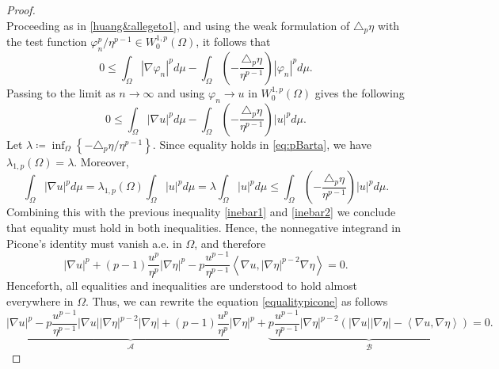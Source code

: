 \documentclass{article}
\begin{document}
\begin{proof}
\[\]
Proceeding as in \eqref{huang&allegeto1}, and using the weak formulation of $\triangle_p\eta$ with the test
function $\varphi_n^p/\eta^{p-1}\in W_0^{1,p}(\Omega)$, it follows that
\[
0 \leq \int_\Omega |\nabla \varphi_n|^p d\mu
-\int_\Omega \left(-\frac{\triangle_p\eta}{\eta^{p-1}}\right)|\varphi_n|^p d\mu.
\]
Passing to the limit as $n\to\infty$ and using $\varphi_n\to u$ in $W_0^{1,p}(\Omega)$ gives the following 
\begin{equation}\label{inebar1}
0 \leq \int_\Omega |\nabla u|^p d\mu
-\int_\Omega \left(-\frac{\triangle_p\eta}{\eta^{p-1}}\right) |u|^p d\mu.    
\end{equation}
Let $\lambda \coloneq \inf_{\Omega}\left\{-\triangle_p\eta/\eta^{p-1}\right\}$. Since equality holds in \eqref{eq:pBarta}, we have $\lambda_{1,p}(\Omega)=\lambda$.
Moreover,
\begin{equation}\label{inebar2}
\int_\Omega |\nabla u|^p d\mu=\lambda_{1,p}(\Omega)\int_\Omega |u|^p d\mu
=\lambda \int_\Omega |u|^p d\mu \leq \int_\Omega\left(-\dfrac{\triangle_p\eta}{\eta^{p-1}}\right)|u|^p d\mu.    
\end{equation}
Combining this with the previous inequality \eqref{inebar1} and \eqref{inebar2} we conclude that equality must hold in both inequalities. Hence, the nonnegative integrand in Picone's identity must vanish a.e. in $\Omega$, and therefore
\begin{equation}\label{equalitypicone}
| \nabla u |^p + (p-1)\frac{u^p}{\eta^p}| \nabla \eta |^p
- p \frac{u^{p-1}}{\eta^{p-1}}
\left\langle \nabla u, |\nabla \eta |^{p-2}\nabla \eta \right\rangle = 0.
\end{equation}
Henceforth, all equalities and inequalities are understood to hold almost everywhere in $\Omega$. Thus, we can rewrite the equation \eqref{equalitypicone} as follows
\begin{equation*}
\underbrace{| \nabla u |^p - p \frac{u^{p-1}}{\eta^{p-1}}
| \nabla u | | \nabla \eta |^{
p-2} | \nabla \eta |
     + (p-1)\frac{u^p}{\eta^p}| \nabla \eta |^p}_{\mathcal{A}} + \underbrace{p \frac{u^{p-1}}{\eta^{p-1}}| \nabla \eta |^{p-2}
\left( | \nabla u |  | \nabla \eta | - \left\langle \nabla u , \nabla \eta \right\rangle \right)}_{\mathcal{B}} =0.
\end{equation*}


\end{proof}
\end{document}
